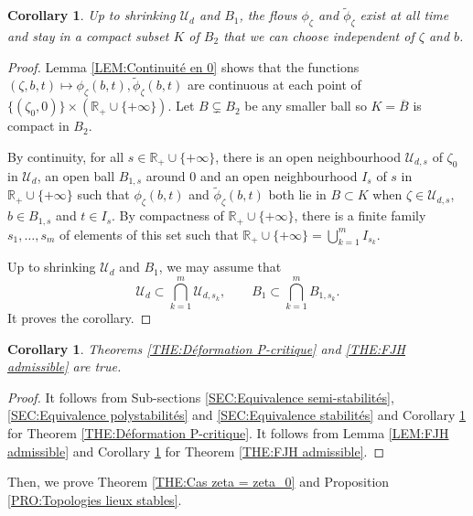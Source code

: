 \documentclass{article}
\newtheorem{corollary}[theorem]{Corollary}
\theoremstyle{remark}
\theoremstyle{definition}
\newcommand{\R}{\mathbb{R}}
\newcommand{\mU}{\mathcal{U}}
\begin{document}
\begin{corollary}\label{COR:Flux défini partout}
    Up to shrinking $\mU_d$ and $B_1$, the flows $\phi_\zeta$ and $\tilde{\phi}_\zeta$ exist at all time and stay in a compact subset $K$ of $B_2$ that we can choose independent of $\zeta$ and $b$.
\end{corollary}
\begin{proof}
Lemma \ref{LEM:Continuité en 0} shows that the functions $(\zeta,b,t) \mapsto \phi_\zeta(b,t),\tilde{\phi}_\zeta(b,t)$ are continuous at each point of $\{(\zeta_0,0)\} \times (\R_+ \cup \{+\infty\})$. Let $B \subsetneq B_2$ be any smaller ball so $K = \overline{B}$ is compact in $B_2$.

By continuity, for all $s \in \R_+ \cup \{+\infty\}$, there is an open neighbourhood $\mU_{d,s}$ of $\zeta_0$ in $\mU_d$, an open ball $B_{1,s}$ around $0$ and an open neighbourhood $I_s$ of $s$ in $\R_+ \cup \{+\infty\}$ such that $\phi_\zeta(b,t)$ and $\tilde{\phi}_\zeta(b,t)$ both lie in $B \subset K$ when $\zeta \in \mU_{d,s}$, $b \in B_{1,s}$ and $t \in I_s$. By compactness of $\R_+ \cup \{+\infty\}$, there is a finite family $s_1,\ldots,s_m$ of elements of this set such that $\R_+ \cup \{+\infty\} = \bigcup_{k = 1}^m I_{s_k}$.

Up to shrinking $\mU_d$ and $B_1$, we may assume that
$$
\mU_d \subset \bigcap_{k = 1}^m \mU_{d,s_k}, \qquad B_1 \subset \bigcap_{k = 1}^m B_{1,s_k}.
$$
It proves the corollary.
\end{proof}

\begin{corollary}
    Theorems \ref{THE:Déformation P-critique} and \ref{THE:FJH admissible} are true.
\end{corollary}
\begin{proof}
It follows from Sub-sections \ref{SEC:Equivalence semi-stabilités}, \ref{SEC:Equivalence polystabilités} and \ref{SEC:Equivalence stabilités} and Corollary \ref{COR:Flux défini partout} for Theorem \ref{THE:Déformation P-critique}. It follows from Lemma \ref{LEM:FJH admissible} and Corollary \ref{COR:Flux défini partout} for Theorem \ref{THE:FJH admissible}.
\end{proof}

Then, we prove Theorem \ref{THE:Cas zeta = zeta_0} and Proposition \ref{PRO:Topologies lieux stables}.
\end{document}

